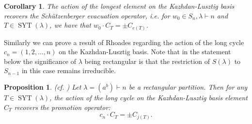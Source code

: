 \documentclass[11pt,reqno]{amsart}
\numberwithin{equation}{section}
\newtheorem{Proposition}[equation]{Proposition}
\newtheorem{Corollary}[equation]{Corollary}
\theoremstyle{definition}
\theoremstyle{named}
\DeclareMathOperator{\SYT}{SYT}
\begin{document}
\begin{Corollary}\cite{BZ96, Stem96} 
The action of the longest element  on the Kazhdan-Lusztig basis recovers the Sch\"utzenberger evacuation operator, i.e. for $w_0 \in S_n, \lambda \vdash n$ and $T\in \SYT(\lambda)$, we have that 
$w_0\cdot C_T =\pm C_{e(T)}$.
\end{Corollary}

Similarly we can prove a result of Rhoades regarding the action of the long cycle  $c_n=(1,2,\hdots,n)$ on the Kazhdan-Lusztig basis.  Note that in the statement below the significance of $\lambda$ being rectangular  is that the restriction of $S(\lambda)$ to $S_{n-1}$ in this case remains irreducible. 

\begin{Proposition}(cf. \cite[Proposition 3.5]{Rhoad})
Let $\lambda=(a^b)\vdash n$ be a rectangular partition.  Then for any $T \in \SYT(\lambda)$, the action of the long cycle on the Kazhdan-Lusztig basis element $C_T$ recovers the promotion operator:
$$
c_n\cdot C_T=\pm C_{j(T)}.
$$ 
\end{Proposition}
\end{document}

